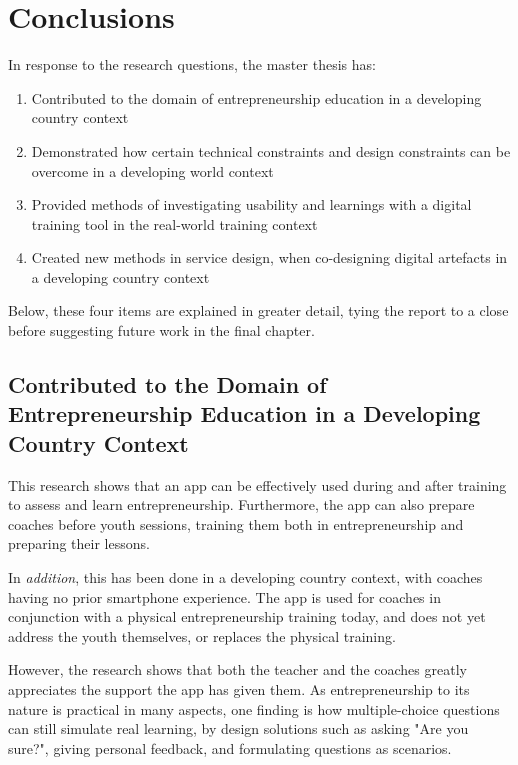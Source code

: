 \chapter{Conclusions}\label{cha:conclusion}


In response to the research questions, the master thesis has: %

\begin{enumerate}
\item Contributed to the domain of entrepreneurship education in a developing country context
\item Demonstrated how certain technical constraints and design constraints can be overcome in a developing world context
\item Provided methods of investigating usability and learnings with a digital training tool in the real-world training context
\item Created new methods in service design, when co-designing digital artefacts in a developing country context
\end{enumerate}

Below, these four items are explained in greater detail, tying the report to a close before suggesting future work in the final chapter.

\section{Contributed to the Domain of Entrepreneurship Education in a Developing Country Context}
This research shows that an app can be effectively used during and after training to assess and learn entrepreneurship. Furthermore, the app can also prepare coaches before youth sessions, training them both in entrepreneurship and preparing their lessons.

In \textit{addition}, this has been done in a developing country context, with coaches having no prior smartphone experience. The app is used for coaches in conjunction with a physical entrepreneurship training today, and does not yet address the youth themselves, or replaces the physical training.

However, the research shows that both the teacher and the coaches greatly appreciates the support the app has given them. As entrepreneurship to its nature is practical in many aspects, one finding is how multiple-choice questions can still simulate real learning, by design solutions such as asking "Are you sure?", giving personal feedback, and formulating questions as scenarios.

